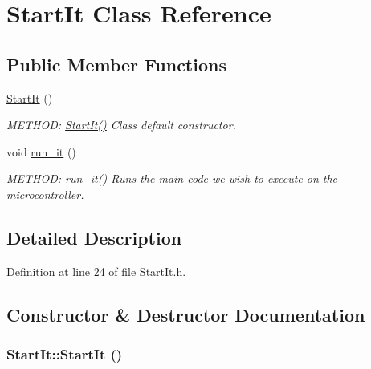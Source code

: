 \hypertarget{classStartIt}{
\section{StartIt Class Reference}
\label{classStartIt}
}
\subsection*{Public Member Functions}
\begin{DoxyCompactItemize}
\item 
\hyperlink{classStartIt_a328e7558712e4870d567c3c4507f12d5_a328e7558712e4870d567c3c4507f12d5}{StartIt} ()
\begin{DoxyCompactList}\small\item\em METHOD: \hyperlink{classStartIt_a328e7558712e4870d567c3c4507f12d5_a328e7558712e4870d567c3c4507f12d5}{StartIt()} Class default constructor. \item\end{DoxyCompactList}\item 
void \hyperlink{classStartIt_a8a1a2a8f7b8f05e248baa8958bb93967_a8a1a2a8f7b8f05e248baa8958bb93967}{run\_\-it} ()
\begin{DoxyCompactList}\small\item\em METHOD: \hyperlink{classStartIt_a8a1a2a8f7b8f05e248baa8958bb93967_a8a1a2a8f7b8f05e248baa8958bb93967}{run\_\-it()} Runs the main code we wish to execute on the microcontroller. \item\end{DoxyCompactList}\end{DoxyCompactItemize}


\subsection{Detailed Description}


Definition at line 24 of file StartIt.h.

\subsection{Constructor \& Destructor Documentation}
\hypertarget{classStartIt_a328e7558712e4870d567c3c4507f12d5_a328e7558712e4870d567c3c4507f12d5}{
\subsubsection[{StartIt}]{\setlength{\rightskip}{0pt plus 5cm}StartIt::StartIt ()}}
\label{classStartIt_a328e7558712e4870d567c3c4507f12d5_a328e7558712e4870d567c3c4507f12d5}


